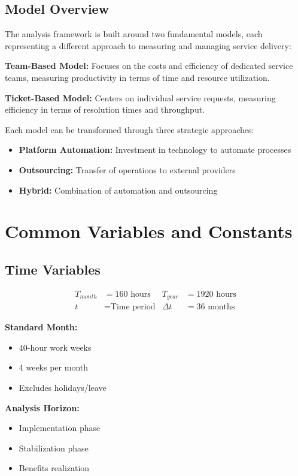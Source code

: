 \documentclass[12pt,a4paper]{article}
\newenvironment{definition}[1]
{\begin{mdframed}[style=definitionstyle,frametitle={Definition: #1}]}
{\end{mdframed}}
\newenvironment{explanation}
{\begin{mdframed}[style=explanationstyle,frametitle={Explanation}]}
{\end{mdframed}}
\begin{document}
\subsection{Model Overview}
\begin{explanation}
The analysis framework is built around two fundamental models, each representing a different approach to measuring and managing service delivery:

\textbf{Team-Based Model:} Focuses on the costs and efficiency of dedicated service teams, measuring productivity in terms of time and resource utilization.

\textbf{Ticket-Based Model:} Centers on individual service requests, measuring efficiency in terms of resolution times and throughput.

Each model can be transformed through three strategic approaches:
\begin{itemize}
    \item \textbf{Platform Automation:} Investment in technology to automate processes
    \item \textbf{Outsourcing:} Transfer of operations to external providers
    \item \textbf{Hybrid:} Combination of automation and outsourcing
\end{itemize}
\end{explanation}

\section{Common Variables and Constants}
\subsection{Time Variables}
\begin{definition}{Time Parameters}
\begin{align*}
    T_{month} &= 160 \text{ hours} & T_{year} &= 1920 \text{ hours} \\
    t &= \text{Time period} & \Delta t &= 36 \text{ months}
\end{align*}
\end{definition}

\begin{explanation}
\textbf{Standard Month:}
\begin{itemize}
    \item 40-hour work weeks
    \item 4 weeks per month
    \item Excludes holidays/leave
\end{itemize}
\textbf{Analysis Horizon:}
\begin{itemize}
    \item Implementation phase
    \item Stabilization phase
    \item Benefits realization
\end{itemize}
\end{explanation}
\end{document}

